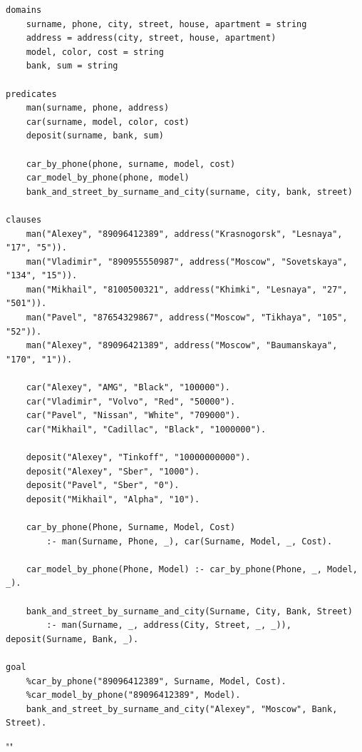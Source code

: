 \documentclass[12pt]{report}
\begin{document}
\newpage
\begin{lstlisting}
domains
	surname, phone, city, street, house, apartment = string
	address = address(city, street, house, apartment)
	model, color, cost = string
	bank, sum = string

predicates
	man(surname, phone, address)
	car(surname, model, color, cost)
	deposit(surname, bank, sum)
	
	car_by_phone(phone, surname, model, cost)
	car_model_by_phone(phone, model)
	bank_and_street_by_surname_and_city(surname, city, bank, street)

clauses	
	man("Alexey", "89096412389", address("Krasnogorsk", "Lesnaya", "17", "5")).
	man("Vladimir", "890955550987", address("Moscow", "Sovetskaya", "134", "15")).
	man("Mikhail", "8100500321", address("Khimki", "Lesnaya", "27", "501")).
	man("Pavel", "87654329867", address("Moscow", "Tikhaya", "105", "52")).
	man("Alexey", "89096421389", address("Moscow", "Baumanskaya", "170", "1")).
	
	car("Alexey", "AMG", "Black", "100000").
	car("Vladimir", "Volvo", "Red", "50000").
	car("Pavel", "Nissan", "White", "709000").
	car("Mikhail", "Cadillac", "Black", "1000000").
	
	deposit("Alexey", "Tinkoff", "10000000000").
	deposit("Alexey", "Sber", "1000").
	deposit("Pavel", "Sber", "0").
	deposit("Mikhail", "Alpha", "10").
	
	car_by_phone(Phone, Surname, Model, Cost)
		:- man(Surname, Phone, _), car(Surname, Model, _, Cost).
	
	car_model_by_phone(Phone, Model) :- car_by_phone(Phone, _, Model, _).
	
	bank_and_street_by_surname_and_city(Surname, City, Bank, Street)
		:- man(Surname, _, address(City, Street, _, _)), deposit(Surname, Bank, _).

goal
	%car_by_phone("89096412389", Surname, Model, Cost).
	%car_model_by_phone("89096412389", Model).
	bank_and_street_by_surname_and_city("Alexey", "Moscow", Bank, Street).
\end{lstlisting}""\newline
\end{document}
